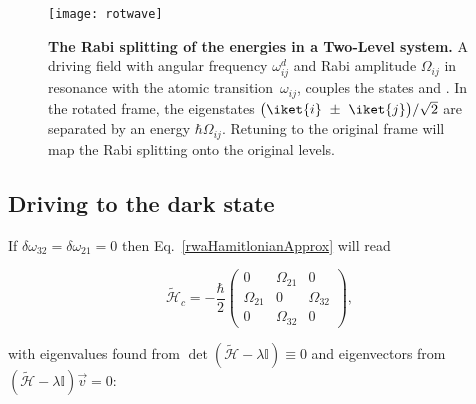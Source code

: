   \begin{figure}
    \centering%
    \texttt{[image: rotwave]}
    \caption{\textbf{The Rabi splitting of  the energies in a Two-Level
        system.}     A   driving    field   with    angular   frequency
      $  \omega_{ij}^{d}  $  and  Rabi amplitude  $  \Omega_{ij}  $  in
      resonance with the atomic transition~$ \omega_{ij} $, couples the
      states    and  .    In  the  rotated  frame,  the
      eigenstates  $   \big(\iket{i}~\pm~\iket{j}\big)/\sqrt{2}  $  are
      separated by  an energy  $ \hbar\Omega_{ij}  $.  Retuning  to the
      original  frame will  map the  Rabi splitting  onto the  original
      levels.}
    \label{theoRotation}
  \end{figure}

  \newpage
  \subsection{Driving to the dark state\label{subsec:DoubleDrive}}
  If   $   \delta\omega_{32}   =   \delta\omega_{21}   =   0   $   then
  Eq.~\eqref{rwaHamitlonianApprox} will read

  \begin{equation}
    \widetilde{\mathcal{H}}_{c} = -\frac{\hbar}{2}
    \begin{pmatrix}
      0 & \Omega_{21} & 0\\  \Omega_{21} & 0 & \Omega_{32} \\
      0 & \Omega_{32} & 0
    \end{pmatrix},
  \end{equation}

  \noindent         with         eigenvalues         found         from
  $   \det(\widetilde{\mathcal{H}}-\lambda\mathbb{I})   \equiv   0   $   and
  eigenvectors                                                     from
  $ (\widetilde{\mathcal{H}}-\lambda\mathbb{I})\vec{v} = 0 $:


